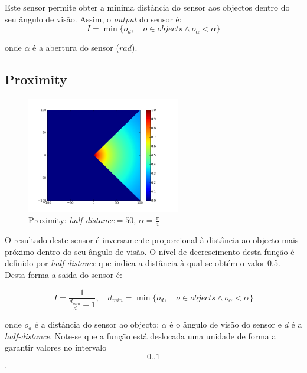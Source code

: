 \documentclass[a4paper]{article}
\begin{document}
\indent Este sensor permite obter a mínima distância do sensor aos objectos dentro do seu ângulo de visão.
Assim, o \emph{output} do sensor é:
\[
	I = \min\{o_{d},\quad o \in objects \land o_{\alpha} < \alpha\}
\] 

onde $\alpha$ é a abertura do sensor ($rad$).

\cleardoublepage
\subsection{Proximity}
\begin{figure}[h]
	\vspace{-20pt}
	\begin{center}
		\includegraphics[width=0.6\textwidth]{graphs/sensors/proximity.png}
	\end{center}
	\vspace{-20pt}
	\caption{Proximity: \emph{half-distance}$=50$, $\alpha=\frac{\pi}{4}$}
\end{figure}

\indent O resultado deste sensor é inversamente proporcional à distância ao objecto mais próximo dentro do seu ângulo de visão.
O nível de decrescimento desta função é definido por \emph{half-distance} que indica a distância à qual se obtém o valor 0.5.
Desta forma a saida do sensor é:

\[
	I = \frac{1}{\frac{d_{min}}{d}+1},\quad d_{min} = \min\{o_{d},\quad o \in objects \land o_{\alpha} < \alpha\}
\]

onde $o_{d}$ é a distância do sensor ao objecto; $\alpha$ é o ângulo de visão do sensor e $d$ é a \emph{half-distance}.
Note-se que a função está deslocada uma unidade de forma a garantir valores no intervalo \[0..1\].

\cleardoublepage
\end{document}
